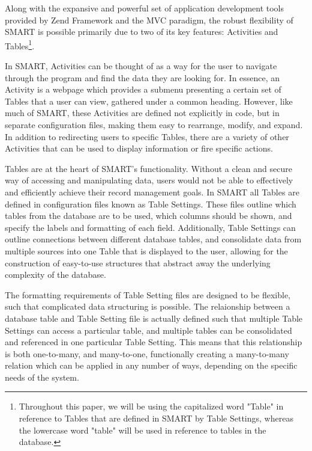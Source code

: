 \documentclass[12pt]{article}
\begin{document}
Along with the expansive and powerful set of application development tools provided by Zend Framework and the MVC paradigm, the robust flexibility of SMART is possible primarily due to two of its key features: Activities and Tables\footnote{Throughout this paper, we will be using the capitalized word "Table" in reference to Tables that are defined in SMART by Table Settings, whereas the lowercase word "table" will be used in reference to tables in the database.}. 

In SMART, Activities can be thought of as a way for the user to navigate through the program and find the data they are looking for. In essence, an Activity is a webpage which provides a submenu presenting a certain set of Tables that a user can view, gathered under a common heading. However, like much of SMART, these Activities are defined not explicitly in code, but in separate configuration files, making them easy to rearrange, modify, and expand. In addition to redirecting users to specific Tables, there are a variety of other Activities that can be used to display information or fire specific actions. %

Tables are at the heart of SMART's functionality. Without a clean and secure way of accessing and manipulating data, users would not be able to effectively and efficiently achieve their record management goals. In SMART all Tables are defined in configuration files known as Table Settings. These files outline which tables from the database are to be used, which columns should be shown, and specify the labels and formatting of each field. Additionally, Table Settings can outline connections between different database tables, and consolidate data from multiple sources into one Table that is displayed to the user, allowing for the construction of easy-to-use structures that abstract away the underlying complexity of the database. %

The formatting requirements of Table Setting files are designed to be flexible, such that complicated data structuring is possible. The relaionship between a database table and Table Setting file is actually defined such that multiple Table Settings can access a particular table, and multiple tables can be consolidated and referenced in one particular Table Setting. This means that this relationship is both one-to-many, and many-to-one, functionally creating a many-to-many relation which can be applied in any number of ways, depending on the specific needs of the system.
\end{document}
